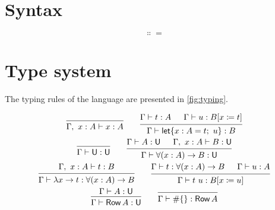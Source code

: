 \section{Syntax}

\[ \Colon= \]

\section{Type system}

The typing rules of the language are presented in \cref{fig:typing}.

\begin{figure}
  \begin{gather*}
    \begin{prooftree}
      \infer0{\Gamma,\ x : A \vdash x : A}
    \end{prooftree}
    \qquad
    \begin{prooftree}
      \hypo{\Gamma \vdash t : A}
      \hypo{\Gamma \vdash u : B[x \coleqq t]}
      \infer2{\Gamma
        \vdash \Let \{ x : A = t;\ u \} : B}
    \end{prooftree}
    \\
    \begin{prooftree}
      \infer0{\Gamma \vdash \Univ : \Univ}
    \end{prooftree}
    \qquad
    \begin{prooftree}
      \hypo{\Gamma \vdash A : \Univ}
      \hypo{\Gamma,\ x : A \vdash B : \Univ}
      \infer2{\Gamma \vdash \forall (x : A) \to B : \Univ}
    \end{prooftree}
    \\
    \begin{prooftree}
      \hypo{\Gamma,\ x : A \vdash t : B}
      \infer1{\Gamma \vdash \lambda x \to t : \forall (x : A) \to B}
    \end{prooftree}
    \qquad
    \begin{prooftree}
      \hypo{\Gamma \vdash t : \forall (x : A) \to B}
      \hypo{\Gamma \vdash u : A}
      \infer2{\Gamma \vdash t\ u : B[x \coleqq u]}
    \end{prooftree}
    \\
    \begin{prooftree}
      \hypo{\Gamma \vdash A : \Univ}
      \infer1{\Gamma \vdash \RowType A : \Univ}
    \end{prooftree}
    \qquad
    \begin{prooftree}
      \infer0{\Gamma \vdash \# \{ \} : \RowType A}
    \end{prooftree}

\end{gather*}
\end{figure}
